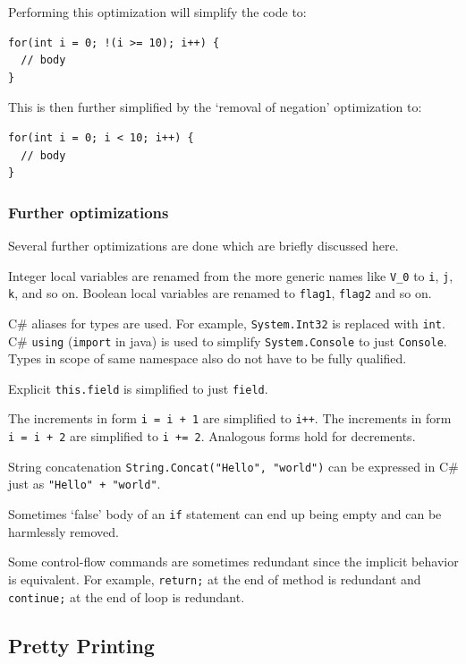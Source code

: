 \documentclass[12pt,twoside,notitlepage]{report}
\begin{document}
Performing this optimization will simplify the code to:
\begin{verbatim}
for(int i = 0; !(i >= 10); i++) {
  // body
}
\end{verbatim}

This is then further simplified by the `removal of negation'
optimization to:

\begin{verbatim}
for(int i = 0; i < 10; i++) {
  // body
}
\end{verbatim}


\subsubsection{Further optimizations}
        \label{Further optimizations}

Several further optimizations are done which are briefly
discussed here.

Integer local variables are renamed from the more generic names
like \verb|V_0| to \verb|i|, \verb|j|, \verb|k|, and so on.
Boolean local variables are renamed to \verb|flag1|, \verb|flag2|
and so on.

C\# aliases for types are used.  For example, \verb|System.Int32|
is replaced with \verb|int|.  C\# \verb|using| (\verb|import| in
java) is used to simplify \verb|System.Console| to just \verb|Console|.
Types in scope of same namespace also do not have to be
fully qualified.

Explicit \verb|this.field| is simplified to just \verb|field|.

The increments in form \verb|i = i + 1| are simplified to \verb|i++|.
The increments in form \verb|i = i + 2| are simplified to \verb|i += 2|.
Analogous forms hold for decrements.

String concatenation \verb|String.Concat("Hello", "world")|
can be expressed in C\# just as \verb|"Hello" + "world"|.

Sometimes `false' body of an \verb|if| statement can end up being
empty and can be harmlessly removed.

Some control-flow commands are sometimes redundant since the
implicit behavior is equivalent.  For example, \verb|return;|
at the end of method is redundant and \verb|continue;| at
the end of loop is redundant.


\subsection{Pretty Printing}
\end{document}
